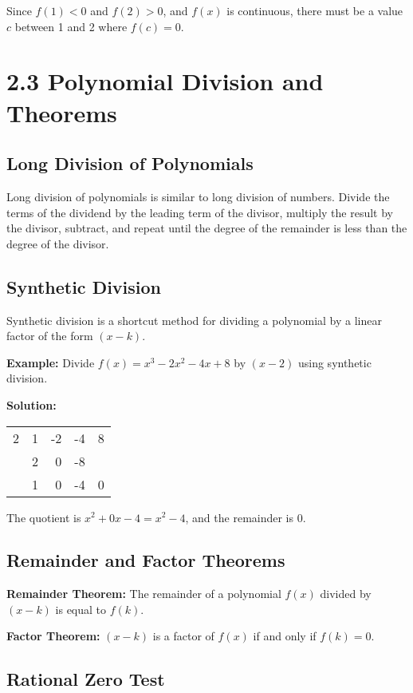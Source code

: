 \documentclass[12pt]{article}
\begin{document}
Since $f(1) < 0$ and $f(2) > 0$, and $f(x)$ is continuous, there must be a value $c$ between 1 and 2 where $f(c) = 0$.

\section{2.3 Polynomial Division and Theorems}

\subsection{Long Division of Polynomials}

Long division of polynomials is similar to long division of numbers. Divide the terms of the dividend by the leading term of the divisor, multiply the result by the divisor, subtract, and repeat until the degree of the remainder is less than the degree of the divisor.

\subsection{Synthetic Division}

Synthetic division is a shortcut method for dividing a polynomial by a linear factor of the form $(x - k)$.

\textbf{Example:} Divide $f(x) = x^3 - 2x^2 - 4x + 8$ by $(x - 2)$ using synthetic division.

\textbf{Solution:}
\begin{center}
\begin{tabular}{r|rrrr}
2 & 1 & -2 & -4 & 8 \\
  & 2 & 0 & -8 & \\
\hline
  & 1 & 0 & -4 & 0
\end{tabular}
\end{center}

The quotient is $x^2 + 0x - 4 = x^2 - 4$, and the remainder is 0.

\subsection{Remainder and Factor Theorems}

\textbf{Remainder Theorem:} The remainder of a polynomial $f(x)$ divided by $(x - k)$ is equal to $f(k)$.

\textbf{Factor Theorem:} $(x - k)$ is a factor of $f(x)$ if and only if $f(k) = 0$.

\subsection{Rational Zero Test}
\end{document}
